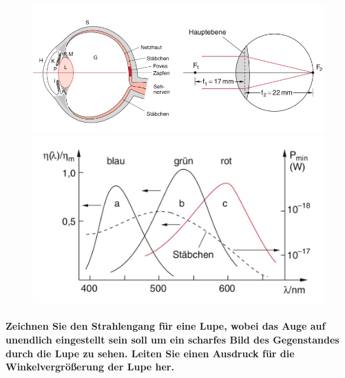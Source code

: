 \documentclass[a4paper, 11pt, ngerman, parskip=half-]{scrartcl}
\begin{document}
\begin{figure}[H]
    \centering
    \begin{minipage}{0.64\linewidth}
        \centering
        \includegraphics[width=\linewidth]{image/20/1.png}
    \end{minipage}%
    \begin{minipage}{0.35\linewidth}
        \centering
        \includegraphics[width=\linewidth]{image/20/2.png}
    \end{minipage}
\end{figure}

\paragraph{Zeichnen Sie den Strahlengang für eine Lupe, wobei das Auge auf unendlich eingestellt
    sein soll um ein scharfes Bild des Gegenstandes durch die Lupe zu sehen. Leiten Sie einen Ausdruck
    für die Winkelvergrößerung der Lupe her.}~
\end{document}
